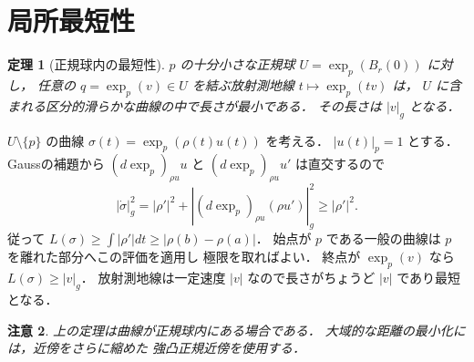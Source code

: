 \documentclass[a5paper,10pt,onecolumn]{jsarticle}
\makeatletter
\theoremstyle{mathnotetheorem}
\newtheorem{theorem}{定理}[section]
\newtheorem{remark}[theorem]{注意}
\renewcommand{\proofname}{証明}
\renewenvironment{proof}[1][\proofname]{%
  \par\pushQED{\qed}\normalfont\topsep4\p@\@plus2\p@\relax
  \trivlist\item[\hskip\labelsep\bfseries #1]\ignorespaces
}{\popQED\endtrivlist\@endpefalse}
\makeatother
\begin{document}
\section{局所最短性}
\begin{theorem}[正規球内の最短性]\label{thm:min}
$p$ の十分小さな正規球 $U=\exp_p(B_r(0))$ に対し，
任意の $q=\exp_p(v)\in U$ を結ぶ放射測地線
$t\mapsto\exp_p(tv)$ は，
$U$ に含まれる区分的滑らかな曲線の中で長さが最小である．
その長さは $|v|_g$ となる．
\end{theorem}
\begin{proof}
$U\setminus\{p\}$ の曲線
$\sigma(t)=\exp_p(\rho(t)u(t))$ を考える．
$|u(t)|_p=1$ とする．
Gaussの補題から
$(d\exp_p)_{\rho u}u$ と
$(d\exp_p)_{\rho u}u'$ は直交するので
\[
 |\dot\sigma|_g^2
 =|\rho'|^2+
 |(d\exp_p)_{\rho u}(\rho u')|_g^2
 \ge|\rho'|^2.
\]
従って
$L(\sigma)\ge\int|\rho'|dt\ge
 |\rho(b)-\rho(a)|$．
始点が $p$ である一般の曲線は
$p$ を離れた部分へこの評価を適用し
極限を取ればよい．
終点が $\exp_p(v)$ なら
$L(\sigma)\ge|v|_g$．
放射測地線は一定速度 $|v|$ なので長さがちょうど
$|v|$ であり最短となる．
\end{proof}
\begin{remark}
上の定理は曲線が正規球内にある場合である．
大域的な距離の最小化には，近傍をさらに縮めた
強凸正規近傍を使用する．
\end{remark}
\end{document}
